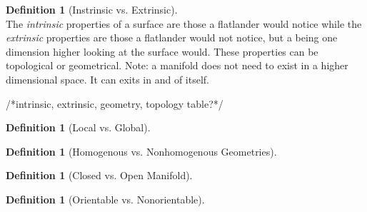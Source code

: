 \documentclass{article}[12pt]
\theoremstyle{definition}
\newtheorem{definition}[theorem]{Definition}
\begin{document}
\begin{definition}[Instrinsic vs. Extrinsic]~\\
    The \emph{intrinsic} properties of a surface are those a flatlander would notice while the \emph{extrinsic} properties are those a flatlander would not notice, but a being one dimension higher looking at the surface would. These properties can be topological or geometrical. Note: a manifold does not need to exist in a higher dimensional space. It can exits in and of itself. 
\end{definition}
/*intrinsic, extrinsic, geometry, topology table?*/

\begin{definition}[Local vs. Global]~\\
    
\end{definition}
\begin{definition}[Homogenous vs. Nonhomogenous Geometries]

\end{definition}
\begin{definition}[Closed vs. Open Manifold]

\end{definition}
\begin{definition}[Orientable vs. Nonorientable]

\end{definition}
\end{document}
